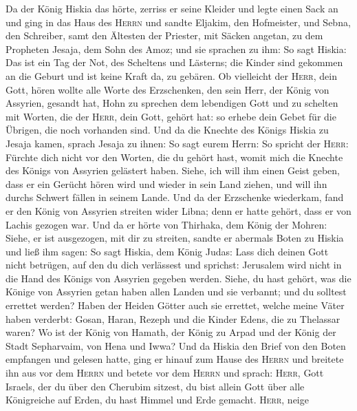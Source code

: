  Da der König Hiskia das hörte, zerriss er seine Kleider
und legte einen Sack an und ging in das Haus des \textsc{Herrn}
 und sandte Eljakim, den Hofmeister, und Sebna, den
Schreiber, samt den Ältesten der Priester, mit Säcken angetan, zu dem
Propheten Jesaja, dem Sohn des Amoz;  und sie sprachen zu
ihm: So sagt Hiskia: Das ist ein Tag der Not, des Scheltens und
Lästerns; die Kinder sind gekommen an die Geburt und ist keine Kraft da,
zu gebären.  Ob vielleicht der \textsc{Herr}, dein Gott,
hören wollte alle Worte des Erzschenken, den sein Herr, der König von
Assyrien, gesandt hat, Hohn zu sprechen dem lebendigen Gott und zu
schelten mit Worten, die der \textsc{Herr}, dein Gott, gehört hat: so
erhebe dein Gebet für die Übrigen, die noch vorhanden sind.
 Und da die Knechte des Königs Hiskia zu Jesaja kamen,
 sprach Jesaja zu ihnen: So sagt eurem Herrn: So spricht
der \textsc{Herr}: Fürchte dich nicht vor den Worten, die du gehört
hast, womit mich die Knechte des Königs von Assyrien gelästert haben.
 Siehe, ich will ihm einen Geist geben, dass er ein
Gerücht hören wird und wieder in sein Land ziehen, und will ihn durchs
Schwert fällen in seinem Lande.  Und da der Erzschenke
wiederkam, fand er den König von Assyrien streiten wider Libna; denn er
hatte gehört, dass er von Lachis gezogen war.  Und da er
hörte von Thirhaka, dem König der Mohren: Siehe, er ist ausgezogen, mit
dir zu streiten, sandte er abermals Boten zu Hiskia und ließ ihm sagen:
 So sagt Hiskia, dem König Judas: Lass dich deinen Gott
nicht betrügen, auf den du dich verlässest und sprichst: Jerusalem wird
nicht in die Hand des Königs von Assyrien gegeben werden.
 Siehe, du hast gehört, was die Könige von Assyrien getan
haben allen Landen und sie verbannt; und du solltest errettet werden?
 Haben der Heiden Götter auch sie errettet, welche meine
Väter haben verderbt: Gosan, Haran, Rezeph und die Kinder Edens, die zu
Thelassar waren?  Wo ist der König von Hamath, der König
zu Arpad und der König der Stadt Sepharvaim, von Hena und Iwwa?
 Und da Hiskia den Brief von den Boten empfangen und
gelesen hatte, ging er hinauf zum Hause des \textsc{Herrn} und breitete
ihn aus vor dem \textsc{Herrn}  und betete vor dem
\textsc{Herrn} und sprach: \textsc{Herr}, Gott Israels, der du über den
Cherubim sitzest, du bist allein Gott über alle Königreiche auf Erden,
du hast Himmel und Erde gemacht.  \textsc{Herr}, neige
